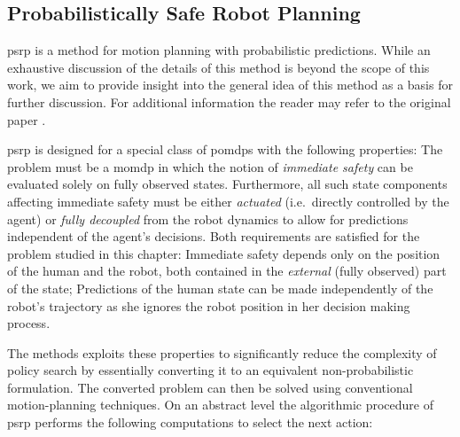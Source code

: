 
\subsection{Probabilistically Safe Robot Planning}\label{sec:hri-baseline}

\acf{psrp} is a method for motion planning with probabilistic predictions.
While an exhaustive discussion of the details of this method is beyond the
scope of this work, we aim to provide insight into the general idea of this
method as a basis for further discussion. For additional information the reader
may refer to the original paper \cite{fisac2018probabilistically}.

\ac{psrp} is designed for a special class of \acp{pomdp} with the following
properties: The problem must be a \ac{momdp} in which the notion of
\emph{immediate safety} can be evaluated solely on fully observed states.
Furthermore, all such state components affecting immediate safety must be
either \emph{actuated} (i.e. directly controlled by the agent) or \emph{fully
decoupled} from the robot dynamics to allow for predictions independent of the
agent's decisions. Both requirements are satisfied for the problem studied in
this chapter: Immediate safety depends only on the position of the human and
the robot, both contained in the \emph{external} (fully observed) part of the
state; Predictions of the human state can be made independently of the robot's
trajectory as she ignores the robot position in her decision making process.

The methods exploits these properties to significantly reduce the complexity of
policy search by essentially converting it to an equivalent non-probabilistic
formulation. The converted problem can then be solved using conventional
motion-planning techniques. On an abstract level the algorithmic procedure of
\ac{psrp} performs the following computations to select the next action:


